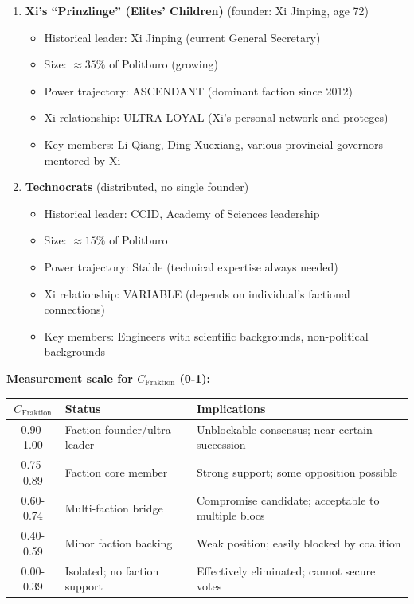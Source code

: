 \documentclass[11pt]{article}
\begin{document}
\begin{enumerate}
\item \textbf{Xi's ``Prinzlinge'' (Elites' Children)} (founder: Xi Jinping, age 72)
   \begin{itemize}
   \item Historical leader: Xi Jinping (current General Secretary)
   \item Size: $\approx 35\%$ of Politburo (growing)
   \item Power trajectory: ASCENDANT (dominant faction since 2012)
   \item Xi relationship: ULTRA-LOYAL (Xi's personal network and proteges)
   \item Key members: Li Qiang, Ding Xuexiang, various provincial governors mentored by Xi
   \end{itemize}

\item \textbf{Technocrats} (distributed, no single founder)
   \begin{itemize}
   \item Historical leader: CCID, Academy of Sciences leadership
   \item Size: $\approx 15\%$ of Politburo
   \item Power trajectory: Stable (technical expertise always needed)
   \item Xi relationship: VARIABLE (depends on individual's factional connections)
   \item Key members: Engineers with scientific backgrounds, non-political backgrounds
   \end{itemize}
\end{enumerate}

\textbf{Measurement scale for $C_{\text{Fraktion}}$ (0-1):}

\begin{table}[h]
\centering
\begin{tabular}{|c|l|l|}
\hline
$C_{\text{Fraktion}}$ & \textbf{Status} & \textbf{Implications} \\
\hline
0.90-1.00 & Faction founder/ultra-leader & Unblockable consensus; near-certain succession \\
0.75-0.89 & Faction core member & Strong support; some opposition possible \\
0.60-0.74 & Multi-faction bridge & Compromise candidate; acceptable to multiple blocs \\
0.40-0.59 & Minor faction backing & Weak position; easily blocked by coalition \\
0.00-0.39 & Isolated; no faction support & Effectively eliminated; cannot secure votes \\
\hline
\end{tabular}
\end{table}
\end{document}
